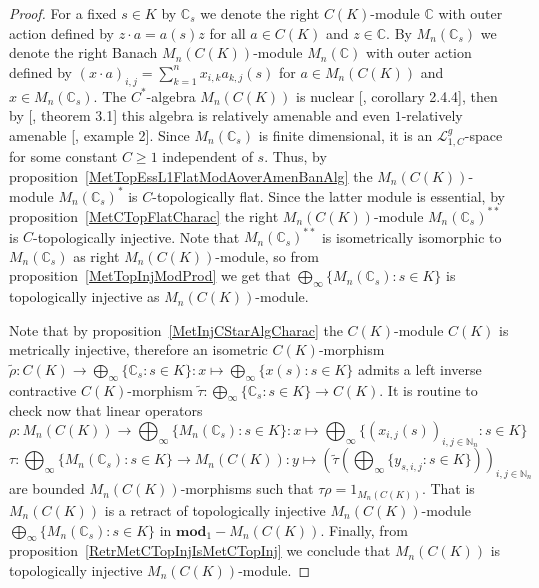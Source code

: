 \begin{proof} For a fixed $s\in K$ by $\mathbb{C}_s$ we denote the right
$C(K)$-module $\mathbb{C}$ with outer action defined by $z\cdot a=a(s)z$ for all
$a\in C(K)$ and $z\in\mathbb{C}$. By $M_n(\mathbb{C}_s)$ we denote the right
Banach $M_n(C(K))$-module $M_n(\mathbb{C})$ with outer action defined by
${(x\cdot a)}_{i,j}=\sum_{k=1}^n x_{i,k}a_{k,j}(s)$ for $a\in M_n(C(K))$ and 
$x\in M_n(\mathbb{C}_s)$. The $C^*$-algebra $M_n(C(K))$ is nuclear
[\cite{BroOzaCStarAlgFinDimApprox}, corollary 2.4.4], then by
[\cite{HaaNucCStarAlgAmen}, theorem 3.1] this algebra is relatively amenable and
even $1$-relatively amenable [\cite{RundeAmenConstFour}, example 2]. Since
$M_n(\mathbb{C}_s)$ is finite dimensional, it is an $\mathscr{L}_{1, C}^g$-space
for some constant $C\geq 1$ independent of $s$. Thus, by
proposition~\ref{MetTopEssL1FlatModAoverAmenBanAlg} the $M_n(C(K))$-module
${M_n(\mathbb{C}_s)}^*$ is $C$-topologically flat. Since the latter module is
essential, by proposition~\ref{MetCTopFlatCharac} the right $M_n(C(K))$-module
${M_n(\mathbb{C}_s)}^{**}$ is $C$-topologically injective. Note that
${M_n(\mathbb{C}_s)}^{**}$ is isometrically isomorphic to $M_n(\mathbb{C}_s)$ as
right $M_n(C(K))$-module, so from proposition~\ref{MetTopInjModProd} we get that
$\bigoplus_\infty \{M_n(\mathbb{C}_s):s\in K \}$ is topologically injective as
$M_n(C(K))$-module.

Note that by proposition~\ref{MetInjCStarAlgCharac} the $C(K)$-module $C(K)$ is
metrically injective, therefore an isometric $C(K)$-morphism
$\widetilde{\rho}
:C(K)\to\bigoplus_\infty \{ \mathbb{C}_s:s\in K \}
:x\mapsto \bigoplus_\infty \{x(s):s\in K \}$ 
admits a left inverse contractive $C(K)$-morphism 
$\widetilde{\tau}:\bigoplus_\infty \{ \mathbb{C}_s:s\in K \} \to C(K)$. 
It is routine to check now that linear operators
$$
\rho
:M_n(C(K))\to\bigoplus\nolimits_\infty \{M_n(\mathbb{C}_s):s\in K \}
:x\mapsto \bigoplus\nolimits_\infty \{
    {(x_{i,j}(s))}_{i,j\in\mathbb{N}_n}:s\in K
 \}
$$
$$
\tau
:\bigoplus\nolimits_\infty \{M_n(\mathbb{C}_s):s\in K \}\to M_n(C(K))
:y\mapsto {\left(
    \widetilde{\tau}\left(\bigoplus\nolimits_\infty \{y_{s,i,j}:s\in K \}\right)
\right)}_{i,j\in\mathbb{N}_n}
$$
are bounded $M_n(C(K))$-morphisms such that $\tau \rho=1_{M_n(C(K))}$. That is
$M_n(C(K))$ is a retract of topologically injective $M_n(C(K))$-module
$\bigoplus_\infty \{M_n(\mathbb{C}_s):s\in K \}$ in $\mathbf{mod}_1-M_n(C(K))$.
Finally, from proposition~\ref{RetrMetCTopInjIsMetCTopInj} we conclude that
$M_n(C(K))$ is topologically injective $M_n(C(K))$-module.
\end{proof}

